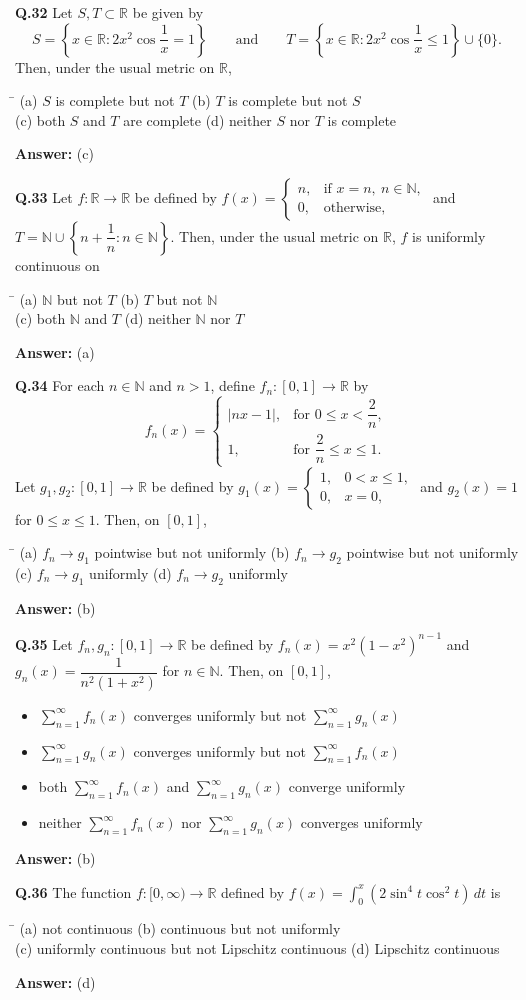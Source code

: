 \documentclass[11pt,a4paper]{article}
\newcommand{\optsfour}[4]{%
  \begin{tabbing}
    \hspace{0.48\linewidth}\=\kill
    (a) #1 \> (b) #2 \\[2pt]
    (c) #3 \> (d) #4
  \end{tabbing}%
}
\newcommand{\optslist}[4]{%
  \begin{itemize}
    \setlength{\itemsep}{2pt}\setlength{\parskip}{0pt}
    \item[(a)] #1
    \item[(b)] #2
    \item[(c)] #3
    \item[(d)] #4
  \end{itemize}%
}
\newcommand{\ans}[1]{\textbf{Answer:} #1\par\medskip}
\begin{document}
\textbf{Q.32} Let $S, T \subset \mathbb{R}$ be given by
\[
  S = \left\{x \in \mathbb{R} : 2x^2 \cos\frac{1}{x} = 1\right\} \qquad \text{and} \qquad T = \left\{x \in \mathbb{R} : 2x^2 \cos\frac{1}{x} \le 1\right\} \cup \{0\}.
\]
Then, under the usual metric on $\mathbb{R}$,
\optsfour{$S$ is complete but not $T$}{$T$ is complete but not $S$}{both $S$ and $T$ are complete}{neither $S$ nor $T$ is complete}
\ans{(c)}

\textbf{Q.33} Let $f : \mathbb{R} \to \mathbb{R}$ be defined by $f(x) = \begin{cases} n, & \text{if } x = n,\ n \in \mathbb{N}, \\ 0, & \text{otherwise,} \end{cases}$ and $T = \mathbb{N} \cup \left\{n + \dfrac{1}{n} : n \in \mathbb{N}\right\}$. Then, under the usual metric on $\mathbb{R}$, $f$ is uniformly continuous on
\optsfour{$\mathbb{N}$ but not $T$}{$T$ but not $\mathbb{N}$}{both $\mathbb{N}$ and $T$}{neither $\mathbb{N}$ nor $T$}
\ans{(a)}

\textbf{Q.34} For each $n \in \mathbb{N}$ and $n > 1$, define $f_n : [0, 1] \to \mathbb{R}$ by
\[
  f_n(x) = \begin{cases} |nx - 1|, & \text{for } 0 \le x < \dfrac{2}{n}, \\ 1, & \text{for } \dfrac{2}{n} \le x \le 1. \end{cases}
\]
Let $g_1, g_2 : [0, 1] \to \mathbb{R}$ be defined by $g_1(x) = \begin{cases} 1, & 0 < x \le 1, \\ 0, & x = 0, \end{cases}$ and $g_2(x) = 1$ for $0 \le x \le 1$. Then, on $[0, 1]$,
\optsfour{$f_n \to g_1$ pointwise but not uniformly}{$f_n \to g_2$ pointwise but not uniformly}{$f_n \to g_1$ uniformly}{$f_n \to g_2$ uniformly}
\ans{(b)}

\textbf{Q.35} Let $f_n, g_n : [0, 1] \to \mathbb{R}$ be defined by $f_n(x) = x^2(1 - x^2)^{n-1}$ and $g_n(x) = \dfrac{1}{n^2(1 + x^2)}$ for $n \in \mathbb{N}$. Then, on $[0, 1]$,
\optslist{$\sum_{n=1}^{\infty} f_n(x)$ converges uniformly but not $\sum_{n=1}^{\infty} g_n(x)$}{$\sum_{n=1}^{\infty} g_n(x)$ converges uniformly but not $\sum_{n=1}^{\infty} f_n(x)$}{both $\sum_{n=1}^{\infty} f_n(x)$ and $\sum_{n=1}^{\infty} g_n(x)$ converge uniformly}{neither $\sum_{n=1}^{\infty} f_n(x)$ nor $\sum_{n=1}^{\infty} g_n(x)$ converges uniformly}
\ans{(b)}

\textbf{Q.36} The function $f : [0, \infty) \to \mathbb{R}$ defined by $f(x) = \displaystyle\int_0^x (2\sin^4 t \cos^2 t)\,dt$ is
\optsfour{not continuous}{continuous but not uniformly}{uniformly continuous but not Lipschitz continuous}{Lipschitz continuous}
\ans{(d)}
\end{document}
